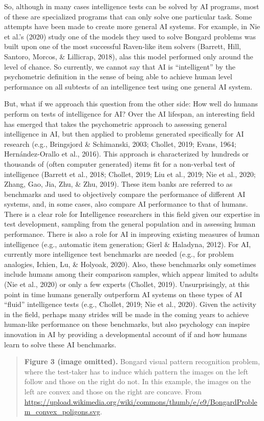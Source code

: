 So, although in many cases intelligence tests can be solved by AI
programs, most of these are specialized programs that can only solve
one particular task.
Some attempts have been made to create more general AI systems.
For example, in Nie et al.'s (2020) study one of the models they used
to solve Bongard problems was built upon one of the most successful
Raven-like item solvers
(Barrett, Hill, Santoro, Morcos, \& Lillicrap, 2018), alas this model
performed only around the level of chance.
So currently, we cannot say that AI is ``intelligent'' by the
psychometric definition in the sense of being able to achieve human
level performance on all subtests of an intelligence test using
one general AI system.

But, what if we approach this question from the other side:
How well do humans perform on tests of intelligence for AI?
Over the AI lifespan, an interesting field has emerged that takes
the psychometric approach to assessing general intelligence in AI,
but then applied to problems generated specifically for AI research
(e.g., Bringsjord \& Schimanski, 2003; Chollet, 2019;
Evans, 1964; Hernández-Orallo et al., 2016).
This approach is characterized by hundreds or thousands of
(often computer generated) items fit for a non-verbal test of
intelligence (Barrett et al., 2018; Chollet, 2019;
Liu et al., 2019; Nie et al., 2020;
Zhang, Gao, Jia, Zhu, \& Zhu, 2019).
These item banks are referred to as benchmarks and used to objectively
compare the performance of different AI systems, and, in some cases,
also compare AI performance to that of humans.
There is a clear role for Intelligence researchers in this field
given our expertise in test development, sampling from the general
population and in assessing human performance.
There is also a role for AI in improving existing measures of human
intelligence (e.g., automatic item generation;
Gierl \& Haladyna, 2012).
For AI, currently more intelligence test benchmarks are needed
(e.g., for problem analogies, Ichien, Lu, \& Holyoak, 2020).
Also, these benchmarks only sometimes include humans among their
comparison samples, which appear limited to adults
(Nie et al., 2020) or only a few experts (Chollet, 2019).
Unsurprisingly, at this point in time humans generally outperform
AI systems on these types of AI ``fluid'' intelligence tests
(e.g., Chollet, 2019; Nie et al., 2020).
Given the activity in the field, perhaps many strides will be made
in the coming years to achieve human-like performance on these
benchmarks, but also psychology can inspire innovation in AI by
providing a developmental account of if and how humans learn
to solve these AI benchmarks.

\begin{quote}
\small
\textbf{Figure 3 (image omitted).}
Bongard visual pattern recognition problem, where the test-taker
has to induce which pattern the images on the left follow and those
on the right do not.
In this example, the images on the left are convex and those on
the right are concave.
From
\url{https://upload.wikimedia.org/wiki/commons/thumb/e/e9/BongardProblem_convex_poligons.svg}.
\end{quote}
